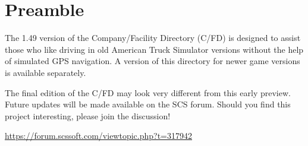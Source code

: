\maketitle

\vspace{5mm}
\section*{Preamble}

{
\justifying

The 1.49 version of the Company/Facility Directory (C/FD) is designed to assist those who like driving in old American Truck Simulator versions without the help of simulated GPS navigation.
A version of this directory for newer game versions is available separately.

The final edition of the C/FD may look very different from this early preview.
Future updates will be made available on the SCS forum.
Should you find this project interesting, please join the discussion!

\centering \vspace{1ex}
\url{https://forum.scssoft.com/viewtopic.php?t=317942} \par
}

\copyrightblock
\thispagestyle{empty}

\tableofcontents
\thispagestyle{empty}
